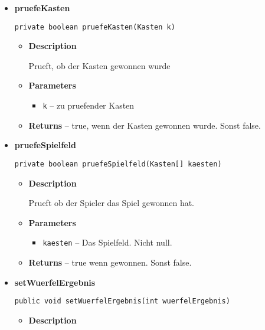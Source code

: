 \documentclass[11pt,a4paper]{report}
\begin{document}
{{{{{{{{{{{\begin{itemize}
{\begin{itemize}
{Setzt einen Pin auf ein freies Feld.
}
\item{
{\bf  Parameters}
  \begin{itemize}
   \item{
\texttt{kaesten} -- Das Spielfeld}
   \item{
\texttt{feldIndex} -- Der Feldindex des gewaehlten Feldes}
   \item{
\texttt{kastenIndex} -- Der Kastenindex des gewaehlten Feldes}
  \end{itemize}
}%
\item{{\bf  Returns} -- 
Gibt true zurueck, wenn das Spiel gewonnen wurde. Sonst false. 
}%
\end{itemize}
}%
\item{ 
{\bf  pruefeKasten}\\
\begin{lstlisting}[frame=none]
private boolean pruefeKasten(Kasten k)\end{lstlisting} %
\begin{itemize}
\item{
{\bf  Description}

Prueft, ob der Kasten gewonnen wurde
}
\item{
{\bf  Parameters}
  \begin{itemize}
   \item{
\texttt{k} -- zu pruefender Kasten}
  \end{itemize}
}%
\item{{\bf  Returns} -- 
true, wenn der Kasten gewonnen wurde. Sonst false. 
}%
\end{itemize}
}%
\item{ 
{\bf  pruefeSpielfeld}\\
\begin{lstlisting}[frame=none]
private boolean pruefeSpielfeld(Kasten[] kaesten)\end{lstlisting} %
\begin{itemize}
\item{
{\bf  Description}

Prueft ob der Spieler das Spiel gewonnen hat.
}
\item{
{\bf  Parameters}
  \begin{itemize}
   \item{
\texttt{kaesten} -- Das Spielfeld. Nicht null.}
  \end{itemize}
}%
\item{{\bf  Returns} -- 
true wenn gewonnen. Sonst false. 
}%
\end{itemize}
}%
\item{ 
{\bf  setWuerfelErgebnis}\\
\begin{lstlisting}[frame=none]
public void setWuerfelErgebnis(int wuerfelErgebnis)\end{lstlisting} %
\begin{itemize}
\item{
{\bf  Description}

}
\end{itemize}}
\end{itemize}}}}}}}}}}}}
\end{document}
